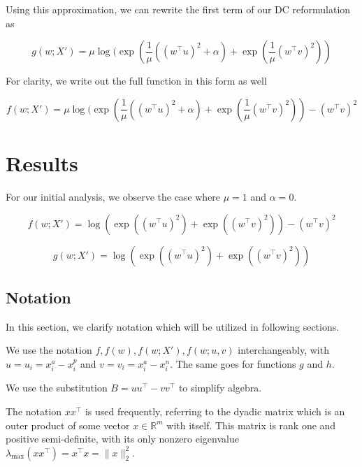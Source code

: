 \documentclass[11pt]{article}
\begin{document}
Using this approximation, we can rewrite the first term of our DC reformulation as

\begin{equation}
    g(w; X') = \mu \log(\exp(\frac{1}{\mu}((w^{\top} u)^2 + \alpha) + \exp(\frac{1}{\mu}(w^{\top} v)^2))
\end{equation}

For clarity, we write out the full function in this form as well

\begin{equation}
\label{eq:full_smooth_margin_f}
    f(w; X') = \mu \log(\exp(\frac{1}{\mu}((w^{\top} u)^2 + \alpha) + \exp(\frac{1}{\mu}(w^{\top} v)^2)) - (w^{\top} v)^2
\end{equation}

\section{Results}

For our initial analysis, we observe the case where $\mu = 1$ and $\alpha = 0$.

\begin{equation}
\label{eq:final_smooth_f}
    f(w; X') = \log(\exp((w^{\top} u)^2) + \exp((w^{\top} v)^2)) - (w^{\top} v)^2 
\end{equation}

\begin{equation}
\label{eq:final_smooth_g}
    g(w; X') = \log(\exp((w^{\top} u)^2) + \exp((w^{\top} v)^2))
\end{equation}

\subsection{Notation}

In this section, we clarify notation which will be utilized in following sections.

We use the notation $f, f(w), f(w; X'), f(w; u, v)$ interchangeably, with $u = u_i = x_i^a - x_i^p$ and $v = v_i = x_i^a - x_i^n$. The same goes for functions $g$ and $h$.

We use the substitution $B = uu^{\top} - vv^{\top}$ to simplify algebra.

The notation $xx^{\top}$ is used frequently, referring to the dyadic matrix which is an outer product of some vector $x \in \mathbb{R}^m$ with itself. This matrix is rank one and positive semi-definite, with its only nonzero eigenvalue $\lambda_{\max}(xx^{\top}) = x^{\top}x = \|x\|_2^2$.
\end{document}
